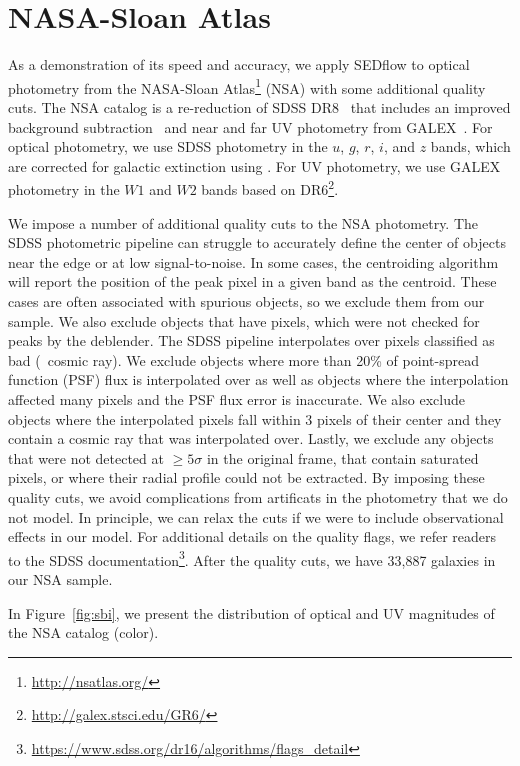 \section{NASA-Sloan Atlas} \label{sec:obs}
As a demonstration of its speed and accuracy, we apply {\sc SEDflow} to optical
photometry from the NASA-Sloan Atlas\footnote{\url{http://nsatlas.org/}} (NSA)
with some additional quality cuts.
The NSA catalog is a re-reduction of SDSS DR8~\citep{aihara2011} that includes
an improved background subtraction~\citep{blanton2011} and near and far UV
photometry from GALEX~\citep{}.
For optical photometry, we use SDSS photometry in the $u$, $g$, $r$, $i$, and
$z$ bands, which are corrected for galactic extinction using
\cite{schlegel1998}.
For UV photometry, we use GALEX photometry in the $W1$ and $W2$ bands based on
DR6\footnote{\url{http://galex.stsci.edu/GR6/}}.

We impose a number of additional quality cuts to the NSA photometry.
The SDSS photometric pipeline can struggle to accurately define the center
of objects near the edge or at low signal-to-noise. 
In some cases, the centroiding algorithm will report the position of the peak
pixel in a given band as the centroid. 
These cases are often associated with spurious objects, so we exclude them
from our sample. 
We also exclude objects that have pixels, which were not checked for peaks
by the deblender. %
The SDSS pipeline interpolates over pixels classified as bad (\eg~cosmic ray).
We exclude objects where more than 20\% of point-spread function (PSF) flux is
interpolated over as well as objects where the interpolation affected many
pixels and the PSF flux error is inaccurate. 
We also exclude objects where the interpolated pixels fall within 3 pixels of
their center and they contain a cosmic ray that was interpolated over.
Lastly, we exclude any objects that were not detected at $\ge5\sigma$ in the
original frame, that contain saturated pixels, or where their radial profile 
could not be extracted.
By imposing these quality cuts, we avoid complications from artificats in the
photometry that we do not model. 
In principle, we can relax the cuts if we were to include observational effects
in our model.
For additional details on the quality flags, we refer readers to the SDSS
documentation\footnote{\url{https://www.sdss.org/dr16/algorithms/flags_detail}}.
After the quality cuts, we have 33,887 galaxies in our NSA sample.

In Figure~\ref{fig:sbi}, we present the distribution of optical and UV
magnitudes of the NSA catalog (color). 




